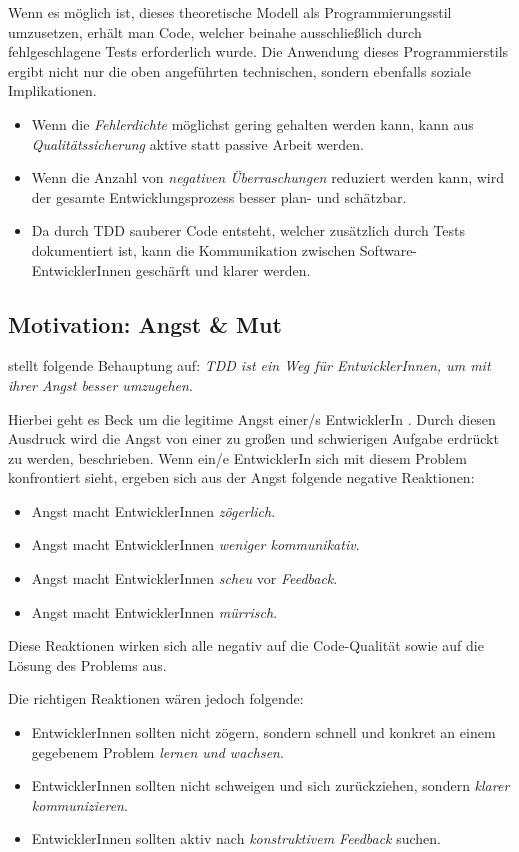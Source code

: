 Wenn es möglich ist, dieses theoretische Modell als Programmierungsstil umzusetzen, erhält man Code, welcher beinahe ausschließlich durch fehlgeschlagene Tests erforderlich wurde. Die Anwendung dieses Programmierstils ergibt nicht nur die oben angeführten technischen, sondern ebenfalls soziale Implikationen.
\begin{itemize}
  \item Wenn die \textit{Fehlerdichte} möglichst gering gehalten werden kann, kann aus \textit{Qualitätssicherung} aktive statt passive Arbeit werden.
  \item Wenn die Anzahl von \textit{negativen Überraschungen} reduziert werden kann, wird der gesamte Entwicklungsprozess besser plan- und schätzbar.
  \item Da durch TDD sauberer Code entsteht, welcher zusätzlich durch Tests dokumentiert ist, kann die Kommunikation zwischen Software-EntwicklerInnen geschärft und klarer werden.
\end{itemize}

\subsection{Motivation: Angst {\&} Mut}
\cite{Beck:2003} stellt folgende Behauptung auf: \newline
\textit{TDD ist ein Weg für EntwicklerInnen, um mit ihrer Angst besser umzugehen}.

Hierbei geht es Beck um die legitime Angst einer/s EntwicklerIn  \autocite{Beck:2003}. Durch diesen Ausdruck wird die Angst von einer zu großen und schwierigen Aufgabe erdrückt zu werden, beschrieben. Wenn ein/e EntwicklerIn sich mit diesem Problem konfrontiert sieht, ergeben sich aus der Angst folgende negative Reaktionen:
\begin{itemize}
  \item Angst macht EntwicklerInnen \textit{zögerlich}.
  \item Angst macht EntwicklerInnen \textit{weniger kommunikativ}.
  \item Angst macht EntwicklerInnen \textit{scheu} vor \textit{Feedback}.
  \item Angst macht EntwicklerInnen \textit{mürrisch}.
\end{itemize}
Diese Reaktionen wirken sich alle negativ auf die Code-Qualität sowie auf die Lösung des Problems aus.

Die richtigen Reaktionen wären jedoch folgende:
\begin{itemize}
  \item EntwicklerInnen sollten nicht zögern, sondern schnell und konkret an einem gegebenem Problem \textit{lernen und wachsen}.
  \item EntwicklerInnen sollten nicht schweigen und sich zurückziehen, sondern \textit{klarer kommunizieren}.
  \item EntwicklerInnen sollten aktiv nach \textit{konstruktivem Feedback} suchen.
\end{itemize}

